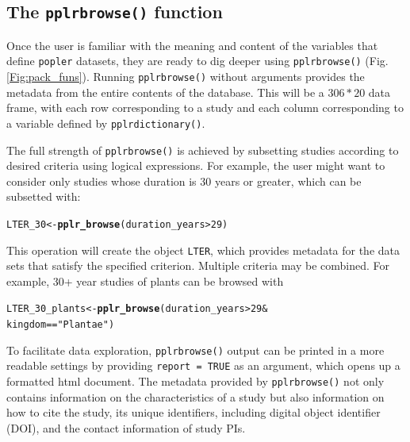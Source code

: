 \documentclass{article}\usepackage[]{graphicx}\usepackage[]{color}
\makeatletter
\newcommand{\hlnum}[1]{\textcolor[rgb]{0.686,0.059,0.569}{#1}}%
\newcommand{\hlstr}[1]{\textcolor[rgb]{0.192,0.494,0.8}{#1}}%
\newcommand{\hlopt}[1]{\textcolor[rgb]{0,0,0}{#1}}%
\newcommand{\hlstd}[1]{\textcolor[rgb]{0.345,0.345,0.345}{#1}}%
\newcommand{\hlkwb}[1]{\textcolor[rgb]{0.69,0.353,0.396}{#1}}%
\newcommand{\hlkwd}[1]{\textcolor[rgb]{0.737,0.353,0.396}{\textbf{#1}}}%
\newenvironment{kframe}{%
 \def\at@end@of@kframe{}%
 \ifinner\ifhmode%
  \def\at@end@of@kframe{\end{minipage}}%
  \begin{minipage}{\columnwidth}%
 \fi\fi%
 \def\FrameCommand##1{\hskip\@totalleftmargin \hskip-\fboxsep
 \colorbox{shadecolor}{##1}\hskip-\fboxsep
     \hskip-\linewidth \hskip-\@totalleftmargin \hskip\columnwidth}%
 \MakeFramed {\advance\hsize-\width
   \@totalleftmargin\z@ \linewidth\hsize
   \@setminipage}}%
 {\par\unskip\endMakeFramed%
 \at@end@of@kframe}
\newenvironment{knitrout}{}{} %
\makeatother
\begin{document}
\subsection*{The \texttt{pplr\textunderscore browse()} function}
Once the user is familiar with the meaning and content of the variables that define \texttt{popler} datasets, they are ready to dig deeper using \texttt{pplr\textunderscore browse()} (Fig. \ref{Fig:pack_funs}). Running \texttt{pplr\textunderscore browse()} without arguments provides the metadata from the entire contents of the database. This will be a $306 * 20$ data frame, with each row corresponding to a study and each column corresponding to a variable defined by \texttt{pplr\textunderscore dictionary()}.

The full strength of \texttt{pplr\textunderscore browse()} is achieved by subsetting studies according to desired criteria using logical expressions. For example, the user might want to consider only studies whose duration is 30 years or greater, which can be subsetted with:
\begin{knitrout}
\color{fgcolor}\begin{kframe}
\begin{alltt}
\hlstd{LTER_30} \hlkwb{<-} \hlkwd{pplr_browse}\hlstd{( duration_years} \hlopt{>} \hlnum{29}\hlstd{)}
\end{alltt}
\end{kframe}
\end{knitrout}
This operation will create the object \texttt{LTER}, which provides metadata for the data sets that satisfy the specified criterion. Multiple criteria may be combined. For example, 30+ year studies of plants can be browsed with
\begin{knitrout}
\color{fgcolor}\begin{kframe}
\begin{alltt}
\hlstd{LTER_30_plants} \hlkwb{<-} \hlkwd{pplr_browse}\hlstd{( duration_years} \hlopt{>} \hlnum{29} \hlopt{&}
                               \hlstd{kingdom} \hlopt{==} \hlstr{"Plantae"}\hlstd{)}
\end{alltt}
\end{kframe}
\end{knitrout}
To facilitate data exploration, \texttt{pplr\textunderscore browse()} output can be printed in a more readable settings by providing \texttt{report = TRUE} as an argument, which opens up a formatted html document. The metadata provided by \texttt{pplr\textunderscore browse()} not only contains information on the characteristics of a study but also information on how to cite the study, its unique identifiers, including digital object identifier (DOI), and the contact information of study PIs. 
\end{document}
